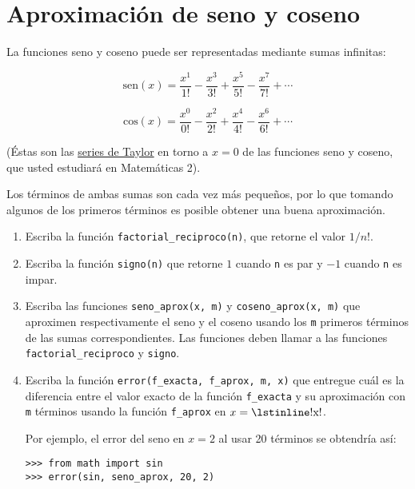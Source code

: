 \section{Aproximación de seno y coseno}

La funciones seno y coseno puede ser representadas mediante sumas
infinitas:

\[\text{sen}(x) =
\frac{x^1}{1!} -
\frac{x^3}{3!} +
\frac{x^5}{5!} -
\frac{x^7}{7!} +
\cdots\]

\[\text{cos}(x) =
\frac{x^0}{0!} -
\frac{x^2}{2!} +
\frac{x^4}{4!} -
\frac{x^6}{6!} +
\cdots\]

(Éstas son las
\href{http://es.wikipedia.org/wiki/Serie\_de\_Taylor}{series de Taylor}
en torno a \(x=0\) de las funciones seno y coseno, que usted estudiará en
Matemáticas 2).

Los términos de ambas sumas son cada vez más pequeños, por lo que
tomando algunos de los primeros términos es posible obtener una buena
aproximación.

\begin{enumerate}
\item
  Escriba la función \lstinline!factorial_reciproco(n)!, que retorne el
  valor \(1/n!\).
\item
  Escriba la función \lstinline!signo(n)! que retorne \(1\) cuando
  \lstinline!n! es par y \(-1\) cuando \lstinline!n! es impar.
\item
  Escriba las funciones \lstinline!seno_aprox(x, m)! y
  \lstinline!coseno_aprox(x, m)! que aproximen respectivamente el seno y
  el coseno usando los \lstinline!m! primeros términos de las sumas
  correspondientes. Las funciones deben llamar a las funciones
  \lstinline!factorial_reciproco! y \lstinline!signo!.
\item
  Escriba la función \lstinline!error(f_exacta, f_aprox, m, x)! que
  entregue cuál es la diferencia entre el valor exacto de la función
  \lstinline!f_exacta! y su aproximación con \lstinline!m! términos
  usando la función \lstinline!f_aprox! en \(x = \text{\lstinline!x!}\).

  Por ejemplo, el error del seno en \(x=2\) al usar 20 términos se
  obtendría así:

\begin{lstlisting}
>>> from math import sin
>>> error(sin, seno_aprox, 20, 2)
\end{lstlisting}
\end{enumerate}
